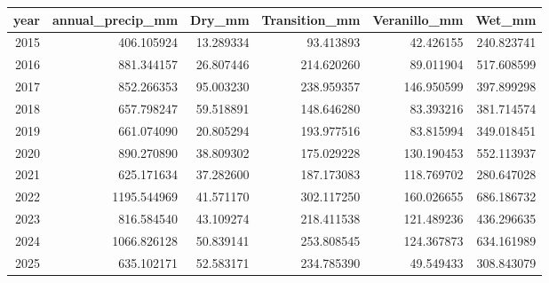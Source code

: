 \begin{tabular}{rrrrrr}
\toprule
year & annual\_precip\_mm & Dry\_mm & Transition\_mm & Veranillo\_mm & Wet\_mm \\
\midrule
2015 & 406.105924 & 13.289334 & 93.413893 & 42.426155 & 240.823741 \\
2016 & 881.344157 & 26.807446 & 214.620260 & 89.011904 & 517.608599 \\
2017 & 852.266353 & 95.003230 & 238.959357 & 146.950599 & 397.899298 \\
2018 & 657.798247 & 59.518891 & 148.646280 & 83.393216 & 381.714574 \\
2019 & 661.074090 & 20.805294 & 193.977516 & 83.815994 & 349.018451 \\
2020 & 890.270890 & 38.809302 & 175.029228 & 130.190453 & 552.113937 \\
2021 & 625.171634 & 37.282600 & 187.173083 & 118.769702 & 280.647028 \\
2022 & 1195.544969 & 41.571170 & 302.117250 & 160.026655 & 686.186732 \\
2023 & 816.584540 & 43.109274 & 218.411538 & 121.489236 & 436.296635 \\
2024 & 1066.826128 & 50.839141 & 253.808545 & 124.367873 & 634.161989 \\
2025 & 635.102171 & 52.583171 & 234.785390 & 49.549433 & 308.843079 \\
\bottomrule
\end{tabular}
